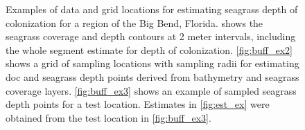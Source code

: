 \documentclass[letterpaper,12pt,oneside]{article}\usepackage[]{graphicx}\usepackage[]{color}
\begin{document}
\begin{figure}
\caption{Examples of data and grid locations for estimating seagrass depth of colonization for a region of the Big Bend, Florida.   shows the seagrass coverage and depth contours at 2 meter intervals, including the whole segment estimate for depth of colonization. \cref{fig:buff_ex2} shows a grid of sampling locations with sampling radii for estimating \ac{doc} and seagrass depth points derived from bathymetry and seagrass coverage layers.  \cref{fig:buff_ex3} shows an example of sampled seagrass depth points for a test location.  Estimates in \cref{fig:est_ex} were obtained from the test location in \cref{fig:buff_ex3}.}
\label{fig:buff_ex}
\end{figure}
\end{document}
